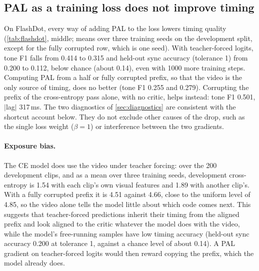 \subsection{PAL as a training loss does not improve timing}
\label{sec:res-loss}



On FlashDot, every way of adding PAL to the loss lowers timing quality (\cref{tab:flashdot}, middle; means over three training seeds on the development split, except for the fully corrupted row, which is one seed). With teacher-forced logits, tone F1 falls from 0.414 to 0.315 and held-out sync accuracy (tolerance 1) from 0.200 to 0.112, below chance (about 0.14), even with 1000 more training steps. Computing PAL from a half or fully corrupted prefix, so that the video is the only source of timing, does no better (tone F1 0.255 and 0.279). Corrupting the prefix of the cross-entropy pass alone, with no critic, helps instead: tone F1 0.501, $|$lag$|$ 317\,ms. The two diagnostics of \cref{sec:diagnostics} are consistent with the shortcut account below. They do not exclude other causes of the drop, such as the single loss weight ($\beta = 1$) or interference between the two gradients.

\paragraph{Exposure bias.}
The CE model does use the video under teacher forcing: over the 200 development clips, and as a mean over three training seeds, development cross-entropy is 1.54 with each clip's own visual features and 1.89 with another clip's. With a fully corrupted prefix it is 4.51 against 4.66, close to the uniform level of 4.85, so the video alone tells the model little about which code comes next. This suggests that teacher-forced predictions inherit their timing from the aligned prefix and look aligned to the critic whatever the model does with the video, while the model's free-running samples have low timing accuracy (held-out sync accuracy 0.200 at tolerance 1, against a chance level of about 0.14). A PAL gradient on teacher-forced logits would then reward copying the prefix, which the model already does.

